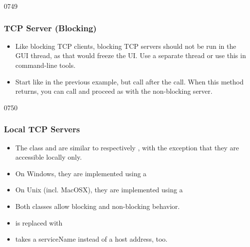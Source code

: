 \begin{slide}{0749}
\frametitle{TCP Server (Blocking)}
  \begin{itemize}
  \item Like blocking TCP clients, blocking TCP servers should not be
        run in the GUI thread, as that would freeze the UI. Use a
        separate thread or use this in command-line tools.
  \item Start like in the previous example, but call
         after the 
        call. When this method returns, you can call
         and proceed as with the
        non-blocking server. 
  \end{itemize}
\end{slide}

\begin{slide}{0750}
\frametitle{Local TCP Servers}
\begin{itemize}
\item The class  and  are similar to
   respectively , with the exception
  that they are accessible locally only.
\item On Windows, they are implemented using a 
\item On Unix (incl. MacOSX), they are implemented using a 
\item Both classes allow blocking and non-blocking behavior.
\item {} is replaced with
\item {} takes a serviceName instead of a
  host address, too.
\end{itemize}
\end{slide}


